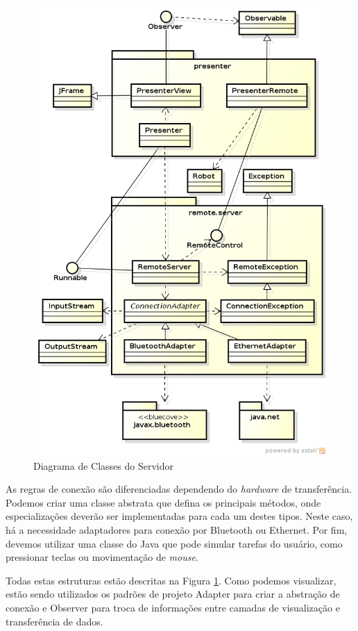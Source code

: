 \documentclass{article}
\begin{document}
\begin{figure}
    \centering{}
    \includegraphics[scale=0.65]{presenter-server.png}
    \caption{Diagrama de Classes do Servidor}
    \label{fig:server}
\end{figure}

As regras de conexão são diferenciadas dependendo do \emph{hardware} de
transferência. Podemos criar uma classe abstrata que defina os principais
métodos, onde especializações deverão ser implementadas para cada um destes
tipos. Neste caso, há a necessidade adaptadores para conexão por Bluetooth ou
Ethernet. Por fim, devemos utilizar uma classe do Java que pode simular tarefas
do usuário, como pressionar teclas ou movimentação de \emph{mouse}.

Todas estas estruturas estão descritas na Figura \ref{fig:server}.
Como podemos visualizar, estão sendo utilizados os padrões de projeto Adapter
para criar a abstração de conexão e Observer para troca de informações entre
camadas de visualização e transferência de dados.
\end{document}
